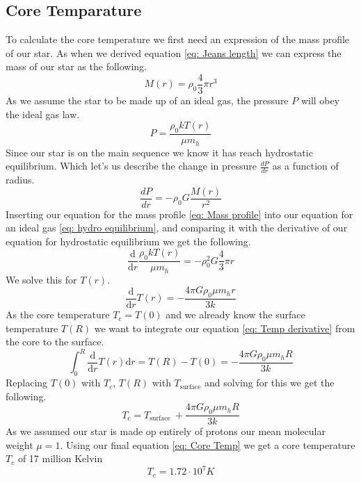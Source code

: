 \documentclass[reprint,english,notitlepage]{revtex4-2}
\begin{document}
\subsection{Core Temparature}
To calculate the core temperature we first need an expression of the mass profile of our star. As when we derived equation \ref{eq: Jeans length} we can express the mass of our star as the following. 
\begin{equation} \label{eq: Mass profile}
  M(r) = ρ_{0} \frac{4}{3} π r^{3}
\end{equation}
As we assume the star to be made up of an ideal gas, the pressure $ P $ will obey the ideal gas law. 
\begin{equation}\label{eq: Ideal gas}
  P = \frac{ρ_{0}kT(r)}{μm_h}
\end{equation}
Since our star is on the main sequence we know it has reach hydrostatic equilibrium. Which let's us describe the change in pressure $ \frac{dP}{dr} $ as a function of radius. 
\begin{equation}\label{eq: hydro equilibrium}
  \frac{dP}{dr } =  - ρ_{0} G \frac{M(r)}{r^{2}} 
\end{equation}
Inserting our equation for the mass profile \ref{eq: Mass profile} into our equation for an ideal gas \ref{eq: hydro equilibrium}, and comparing it with the derivative of our equation for hydrostatic equilibrium we get the following. 
\begin{equation}
  \frac{\mathrm{d}}{\mathrm{d}r} \frac{ρ_{0}kT(r)}{μm_h} = -ρ_{0}^{2}G \frac{4}{3} πr
\end{equation}
We solve this for $ T(r) $. 
\begin{equation} \label{eq: Temp derivative}
  \frac{\mathrm{d}}{\mathrm{d}r}T(r) = - \frac{4 π G ρ_{0}μ m_h r}{3k}
\end{equation}
As the core temperature $ T_c = T(0) $  and we already know the surface temperature $ T(R) $ we want to integrate our equation \ref{eq: Temp derivative} from the core to the surface. 
\begin{equation}
  \int_{0}^{R} \frac{\mathrm{d}}{\mathrm{d}r}T(r) \mathrm{d}r = T(R) - T(0) = - \frac{4 π G ρ_{0}μ m_h R}{3k}
\end{equation}
Replacing $ T(0) $ with $ T_c $, $ T(R) $ with $ T_\text{surface} $ and solving for this we get the following. 
\begin{equation}\label{eq: Core Temp}
  T_c = T_{\text{surface }} + \frac{4 π G ρ_{0}μ m_h R}{3k}
\end{equation} 
As we assumed our star is made op entirely of protons our mean molecular weight $ μ = 1 $. Using our final equation \ref{eq: Core Temp} we get a core temperature $ T_c $ of 17 million Kelvin
\begin{equation}\label{eq: T_c}
  T_c = 1.72 ⋅ 10^{7} K
\end{equation}
\end{document}
